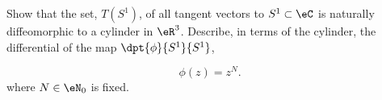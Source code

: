 \begin{exercice}\label{exo003}

Show that the set, $T(S^1)$, of all tangent vectors to $S^1\subset\eC$ is naturally diffeomorphic
to a cylinder in $\eR^3$. Describe, in terms of the cylinder, the differential of 
the map $\dpt{ \phi }{ S^1 }{ S^1 }$,

\[
\phi(z)=z^N.
\]
where $N\in\eN_0$ is fixed.

\end{exercice}
